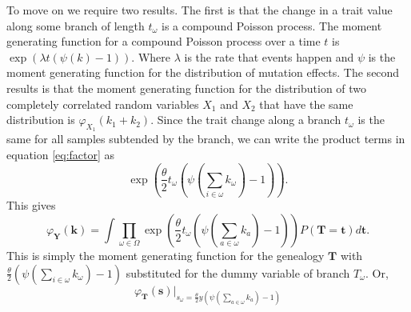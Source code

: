To move on we require two results. The first is that the change in a
trait value along some branch of length $t_\omega$ is a compound
Poisson process. The moment generating function for a compound Poisson
process over a time $t$ is $\exp\left(\lambda t (\psi(k)-1)\right)$.
Where $\lambda$ is the rate that events happen and $\psi$ is the
moment generating function for the distribution of mutation effects.
The second results is that the moment generating function for the
distribution of two completely correlated random variables $X_1$ and
$X_2$ that have the same distribution is $\varphi_{X_1}(k_1+k_2)$. Since
the trait change along a branch $t_{\omega}$ is the same for all
samples subtended by the branch, we can write the product terms in
equation \ref{eq:factor} as
\begin{equation}
  \exp\left( \frac{\theta}{2} t_{\omega} \left( \psi\left(\sum_{i \in \omega}k_{\omega}\right) -1 \right)\right).
\end{equation}
This gives
\begin{equation}
  \varphi_{\mathbf{Y}}(\mathbf{k}) = \int \prod_{\omega \in \Omega}
  \exp\left( \frac{\theta}{2} t_{\omega} \left( \psi\left(\sum_{a \in \omega}k_{a}\right) -1 \right)\right)
  P(\mathbf{T}=\mathbf{t})d\mathbf{t}.
\end{equation}
This is simply the moment generating function for the genealogy
$\mathbf{T}$ with $\frac{\theta}{2} \left( \psi(\sum_{i \in
  \omega}k_{\omega}) -1 \right)$ substituted for the dummy variable of
branch $T_{\omega}$. Or,
\begin{equation}
  \label{eq:sub}
  \varphi_{\mathbf{T}}(\mathbf{s})\Bigr|_{s_{\omega}=\frac{\theta}{2}y \left( \psi\left(\sum_{a \in \omega}k_{a}\right) -1 \right)}
\end{equation}

